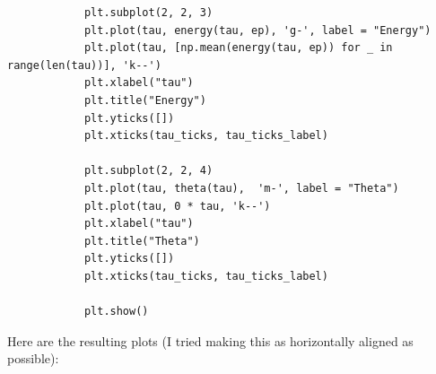 \documentclass[12pt]{article}
\newcommand{\jump}{\vspace{5mm}}
\begin{document}
\begin{enumerate}[]
\begin{solution}
\begin{lstlisting}
            plt.subplot(2, 2, 3)
            plt.plot(tau, energy(tau, ep), 'g-', label = "Energy")
            plt.plot(tau, [np.mean(energy(tau, ep)) for _ in range(len(tau))], 'k--')
            plt.xlabel("tau")
            plt.title("Energy")
            plt.yticks([])  
            plt.xticks(tau_ticks, tau_ticks_label)
            
            plt.subplot(2, 2, 4)
            plt.plot(tau, theta(tau),  'm-', label = "Theta")
            plt.plot(tau, 0 * tau, 'k--')
            plt.xlabel("tau")
            plt.title("Theta")
            plt.yticks([])  
            plt.xticks(tau_ticks, tau_ticks_label)
            
            plt.show()

            \end{lstlisting}

            Here are the resulting plots (I tried making this as horizontally aligned as possible):
            
            \jump
            \centerline{\noindent}%
            \jump


\end{solution}
\end{enumerate}
\end{document}
